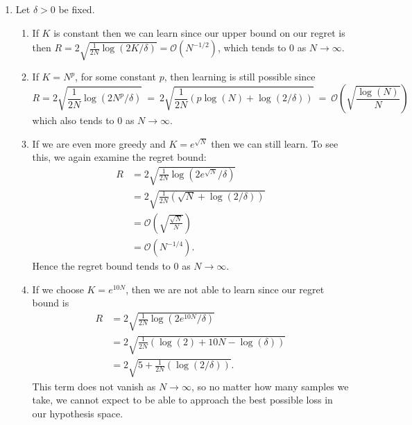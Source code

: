 \documentclass{article}
\begin{document}
\begin{enumerate}
	\item Let $\delta>0$ be fixed.
	\begin{enumerate}
		\item If $K$ is constant then we can learn since our upper bound on our regret is then $R = 2\sqrt{\frac{1}{2N}\log(2K/\delta)} = \mathcal{O}(N^{-1/2})$, which tends to 0 as $N\to\infty$.
		\item If $K=N^p$, for some constant $p$, then learning is still possible since
		\[
			R = 2\sqrt{\frac{1}{2N}\log(2N^p/\delta)} ~=~ 2\sqrt{\frac{1}{2N}\left(p\log(N)+\log(2/\delta)\right)} ~=~ \mathcal{O}\left(\sqrt{\frac{\log(N)}{N}}\right)
		\]
		which also tends to 0 as $N\to\infty$.
		\item If we are even more greedy and $K=e^{\sqrt{N}}$ then we can still learn. To see this, we again examine the regret bound:
		\begin{align*}
			R &= 2\sqrt{\frac{1}{2N}\log(2e^{\sqrt{N}}/\delta)}\\
			&= 2\sqrt{\frac{1}{2N}\left(\sqrt{N}+\log(2/\delta)\right)}\\
			&= \mathcal{O}\left(\sqrt{\frac{\sqrt{N}}{N}}\right)\\
			&= \mathcal{O}\left(N^{-1/4}\right).
		\end{align*}
		Hence the regret bound tends to 0 as $N\to\infty$.
		\item If we choose $K=e^{10N}$, then we are not able to learn since our regret bound is
		\begin{align*}
			R &= 2\sqrt{\frac{1}{2N}\log(2e^{10N}/\delta)}\\
			&= 2\sqrt{\frac{1}{2N}(\log(2)+10N-\log(\delta))}\\
			&=2\sqrt{5+\frac{1}{2N}(\log(2/\delta))}.
		\end{align*}
		This term does not vanish as $N\to\infty$, so no matter how many samples we take, we cannot expect to be able to approach the best possible loss in our hypothesis space.
	\end{enumerate}
\end{enumerate}
\end{document}
